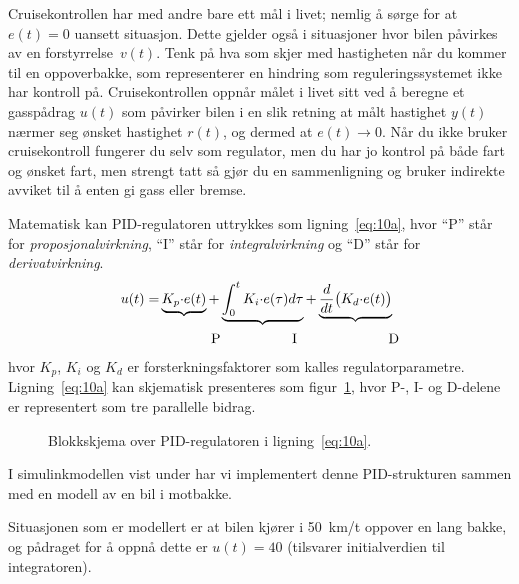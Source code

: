 Cruisekontrollen har med andre bare ett mål 
i livet; nemlig å sørge for at $e(t){=}0$ uansett situasjon.
Dette gjelder også
i situasjoner hvor bilen påvirkes av en forstyrrelse~$v(t)$. Tenk på
hva som skjer med hastigheten når du kommer til en
oppoverbakke, som representerer en hindring som reguleringssystemet
ikke har kontroll på. 
Cruisekontrollen oppnår målet i livet sitt ved å beregne et gasspådrag
$u(t)$ som påvirker bilen i en slik retning at målt hastighet $y(t)$
nærmer seg ønsket hastighet $r(t)$, og dermed at $e(t)\rightarrow 0$.
Når du ikke bruker cruisekontroll fungerer du selv som regulator, men
du har jo kontrol på både fart og ønsket fart, men
strengt tatt så gjør du en sammenligning og bruker indirekte avviket
til å enten gi gass eller bremse. 



Matematisk kan PID-regulatoren uttrykkes som ligning~\eqref{eq:10a}, 
hvor ``P'' står for {\it proposjonalvirkning}, ``I'' står
for {\it integralvirkning} og ``D'' står for {\it derivatvirkning}.
\begin{align}
 u(t) = &  \underbrace{K_p{\cdot} e(t)} + 
             \underbrace{\int_0^t K_{i}{\cdot}e(\tau)d\tau} + 
             \underbrace{\frac{d}{dt} \bigr(K_d {\cdot} e(t) \bigl) }   \label{eq:10a}\\
 & \hspace*{13mm} \mathrm{P} \hspace*{18mm} \mathrm{I} 
\hspace*{23mm} \mathrm{D} \notag
\end{align}
hvor $K_p$, $K_{i}$ og $K_{d}$ er forsterkningsfaktorer som kalles
regulatorparametre.
Ligning~\eqref{eq:10a} kan skjematisk
presenteres som figur~\ref{fig:pid_blokk}, hvor P-, I- og
D-delene er representert som tre parallelle bidrag.
\begin{figure}[H]
  \centering
  \hspace*{0mm}
  \caption{Blokkskjema over  PID-regulatoren i
    ligning~\eqref{eq:10a}.} 
  \label{fig:pid_blokk}
\end{figure}


I simulinkmodellen  vist under har 
vi implementert denne PID-strukturen sammen med en
modell av en bil i motbakke.
\begin{figure}[H]
    \centering
    \hspace*{-20mm}
  \end{figure}
  Situasjonen som er modellert er at bilen kjører i 50~km/t oppover
  en lang bakke, og  pådraget for å oppnå dette er $u(t){=}40$
  (tilsvarer initialverdien til integratoren).
  
